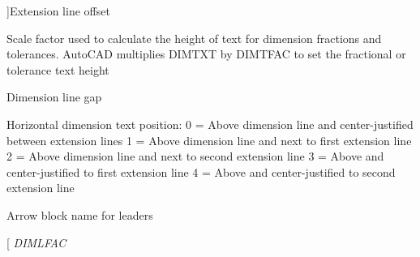 \begin{Desc}
\begin{description}
{}]Extension line offset \item[{\em 
D\+I\+M\+F\+AC\hypertarget{class_c_a_d_header_abd894aab7aa85b4c4634e67fb93d6886a7a449b422e0e2fa92df674a6d8e84ecd}{}\label{class_c_a_d_header_abd894aab7aa85b4c4634e67fb93d6886a7a449b422e0e2fa92df674a6d8e84ecd}
}]Scale factor used to calculate the height of text for dimension fractions and tolerances. Auto\+C\+AD multiplies D\+I\+M\+T\+XT by D\+I\+M\+T\+F\+AC to set the fractional or tolerance text height \item[{\em 
D\+I\+M\+G\+AP\hypertarget{class_c_a_d_header_abd894aab7aa85b4c4634e67fb93d6886ac03300484d341ee71b9c648b600f08e4}{}\label{class_c_a_d_header_abd894aab7aa85b4c4634e67fb93d6886ac03300484d341ee71b9c648b600f08e4}
}]Dimension line gap \item[{\em 
D\+I\+M\+J\+U\+ST\hypertarget{class_c_a_d_header_abd894aab7aa85b4c4634e67fb93d6886a4e3839a44dee79ecf03939b3900e454c}{}\label{class_c_a_d_header_abd894aab7aa85b4c4634e67fb93d6886a4e3839a44dee79ecf03939b3900e454c}
}]Horizontal dimension text position\+: 0 = Above dimension line and center-\/justified between extension lines 1 = Above dimension line and next to first extension line 2 = Above dimension line and next to second extension line 3 = Above and center-\/justified to first extension line 4 = Above and center-\/justified to second extension line \item[{\em 
D\+I\+M\+L\+D\+R\+B\+LK\hypertarget{class_c_a_d_header_abd894aab7aa85b4c4634e67fb93d6886abb1299cb3fb61a8c34eaec06be4cc095}{}\label{class_c_a_d_header_abd894aab7aa85b4c4634e67fb93d6886abb1299cb3fb61a8c34eaec06be4cc095}
}]Arrow block name for leaders \item[{\em 
D\+I\+M\+L\+F\+AC\hypertarget{class_c_a_d_header_abd894aab7aa85b4c4634e67fb93d6886af9f9761c672a41e4e736212fd5942a4a}{}\label{class_c_a_d_header_abd894aab7aa85b4c4634e67fb93d6886af9f9761c672a41e4e736212fd5942a4a}
}
\end{description}
\end{Desc}
